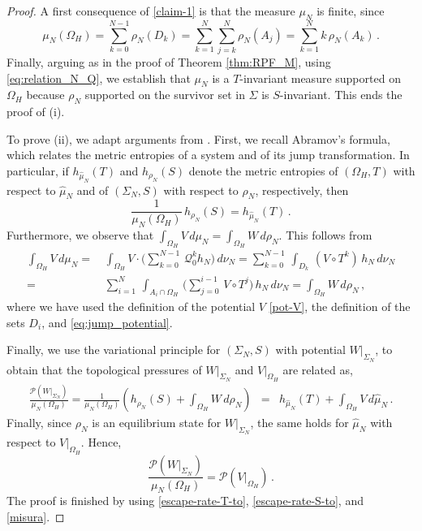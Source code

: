 \documentclass{amsart}
\theoremstyle{definition}
\theoremstyle{remark}
\theoremstyle{definition}
\numberwithin{equation}{section}
\newcommand{\CP}{{\mathcal P}}
\newcommand{\CQ}{{\mathcal Q}}
\newcommand{\CW}{{W}}
\begin{document}
\begin{proof}
A first consequence of \eqref{claim-1} is that the measure $\mu_{N}$ is finite, since
\begin{equation} \label{misura}
\mu_{N}(\Omega_{H}) = \sum\limits_{k =0}^{N-1} \rho_{N}( D_{k}) = \sum\limits_{k =1}^{N} \sum\limits_{j =k}^{N}\rho_{N}( A_{j}) = \sum\limits_{k=1}^{N} k \, \rho_{N}(A_{k})\, .
\end{equation}
Finally, arguing as in the proof of Theorem \ref{thm:RPF_M}, using \eqref{eq:relation_N_Q}, we establish that $\mu_{N}$ is a $T$-invariant measure supported on $\Omega_{H}$ because $\rho_{N}$ supported on the survivor set in $\Sigma$ is $S$-invariant. This ends the proof of (i).

To prove (ii), we adapt arguments from \cite{Is}. First, we recall Abramov's formula, which relates the metric entropies of a system and of its jump transformation. In particular, if $h_{\hat{\mu}_{N}}(T)$ and $h_{\rho_{N}}(S)$ denote the metric entropies of $(\Omega_H,T)$ with respect to $\hat{\mu}_{N}$ and of $(\Sigma_N,S)$ with respect to $\rho_{N}$, respectively, then
\[
\frac{1}{\mu_{N}(\Omega_{H})}\, h_{\rho_{N}}(S) = h_{\hat{\mu}_{N}}(T)\, .
\]
Furthermore, we observe that $\int_{\Omega_{H}}V \, d\mu_{N} = \int_{\Omega_{H}}\CW \, d\rho_{N}$. This follows from
\[
\begin{aligned}
\int_{\Omega_{H}}V \, d\mu_{N} = &\, \int_{\Omega_{H}} V \cdot \Big( \sum_{k=0}^{N-1}\, \CQ_0^k h_N \Big)\, d\nu_N = \sum_{k=0}^{N-1}\, \int_{D_k}\, (V\circ T^k)\, h_N\, d\nu_N \\[0.2cm]
= &\, \sum_{i=1}^N\, \int_{A_i\cap \Omega_H}\, \Big( \sum_{j=0}^{i-1}\, V\circ T^j \Big)\, h_N\, d\nu_N = \int_{\Omega_{H}}\CW \, d\rho_{N}\, ,
\end{aligned}
\]
where we have used the definition of the potential $V$ \eqref{pot-V}, the definition of the sets $D_i$, and \eqref{eq:jump_potential}.

Finally, we use the variational principle for $(\Sigma_N,S)$ with potential $\CW|_{\Sigma_{N}}$, to obtain that the topological pressures of $\CW|_{\Sigma_{N}}$ and $V|_{\Omega_{H}}$ are related as,
\begin{eqnarray*}
    \frac{\CP(W|_{\Sigma_{N}})}{\mu_{N}(\Omega_{H})}  =  \frac{1}{\mu_{N}(\Omega_{H})} \left( h_{\rho_{N}}(S) + \int_{\Omega_{H}}\CW \, d\rho_{N} \right) & = &  h_{\hat{\mu}_{N}}(T) + \int_{\Omega_{H}}V \, d\hat{\mu}_{N}\, .\end{eqnarray*}
Finally, since $\rho_{N}$ is an equilibrium state for $\CW|_{\Sigma_{N}}$, the same holds for $\hat{\mu}_{N}$ with respect to $V|_{\Omega_{H}}$. Hence,
\[
\frac{\CP(W|_{\Sigma_{N}})}{\mu_{N}(\Omega_{H})}  = \CP(V|_{\Omega_{H}})\, .
\]
The proof is finished by using \eqref{escape-rate-T-to}, \eqref{escape-rate-S-to}, and \eqref{misura}.
\end{proof}
\end{document}

